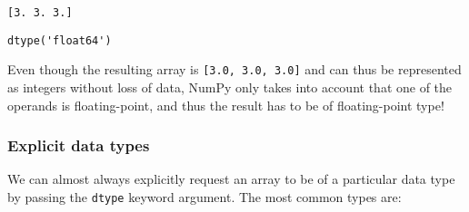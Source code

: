 \documentclass[10pt]{scrartcl}
\makeatletter
\newcommand{\boxspacing}{\kern\kvtcb@left@rule\kern\kvtcb@boxsep}
\newcommand{\prompt}[4]{
        {\ttfamily\llap{{\color{#2}[#3]:\hspace{3pt}#4}}\vspace{-\baselineskip}}
    }
\makeatother
\begin{document}
    \begin{Verbatim}[commandchars=\\\{\}]
[3. 3. 3.]
    \end{Verbatim}

            \begin{tcolorbox}[breakable, size=fbox, boxrule=.5pt, pad at break*=1mm, opacityfill=0]
\prompt{Out}{outcolor}{78}{\boxspacing}
\begin{Verbatim}[commandchars=\\\{\}]
dtype('float64')
\end{Verbatim}
\end{tcolorbox}
        
    Even though the resulting array is \texttt{{[}3.0,\ 3.0,\ 3.0{]}} and
can thus be represented as integers without loss of data, NumPy only
takes into account that one of the operands is floating-point, and thus
the result has to be of floating-point type!

    \hypertarget{explicit-data-types}{%
\subsubsection{Explicit data types}\label{explicit-data-types}}

We can almost always explicitly request an array to be of a particular
data type by passing the \texttt{dtype} keyword argument. The most
common types are:
\end{document}
